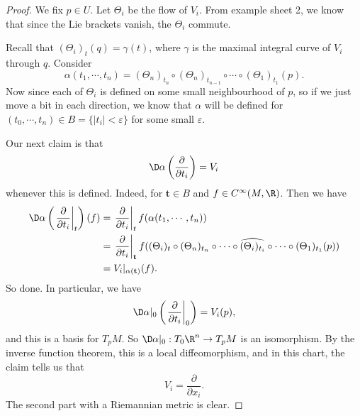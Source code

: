 \documentclass[a4paper]{article}
\begin{document}
\begin{proof}
  We fix $p \in U$. Let $\Theta_i$ be the flow of $V_i$. From example sheet 2, we know that since the Lie brackets vanish, the $\Theta_i$ commute.

  Recall that $(\Theta_i)_t(q) = \gamma(t)$, where $\gamma$ is the maximal integral curve of $V_i$ through $q$. Consider
  \[
    \alpha(t_1, \cdots, t_n) = (\Theta_n)_{t_n} \circ (\Theta_n)_{t_{n - 1}} \circ \cdots \circ (\Theta_1)_{t_1}(p).
  \]
  Now since each of $\Theta_i$ is defined on some small neighbourhood of $p$, so if we just move a bit in each direction, we know that $\alpha$ will be defined for $(t_0, \cdots, t_n) \in B = \{|t_i| < \varepsilon\}$ for some small $\varepsilon$.

  Our next claim is that
  \[
    \D\alpha\left(\frac{\partial}{\partial t_i}\right) = V_i
  \]
  whenever this is defined. Indeed, for $\mathbf{t} \in B$ and $f \in C^\infty(M, \R)$. Then we have
  \begin{align*}
    \D\alpha \left(\left.\frac{\partial}{\partial t_i}\right|_t\right)(f) &= \left.\frac{\partial}{\partial t_i}\right|_t f(\alpha(t_1, \cdots, t_n))\\
    &= \left.\frac{\partial}{\partial t_i} \right|_{\mathbf{t}} f((\Theta_i)_t \circ (\Theta_n)_{t_n} \circ \cdots \circ \widehat{(\Theta_i)_{t_i}} \circ \cdots \circ (\Theta_1)_{t_1}(p))\\
    &= V_i|_{\alpha(\mathbf{t})}(f).
  \end{align*}
  So done. In particular, we have
  \[
    \D \alpha|_0 \left(\left.\frac{\partial}{\partial t_i}\right|_0\right) = V_i(p),
  \]
  and this is a basis for $T_p M$. So $\D \alpha|_0: T_0 \R^n \to T_p M$ is an isomorphism. By the inverse function theorem, this is a local diffeomorphism, and in this chart, the claim tells us that
  \[
    V_i = \frac{\partial}{\partial x_i}.
  \]
  The second part with a Riemannian metric is clear.
\end{proof}
\end{document}
